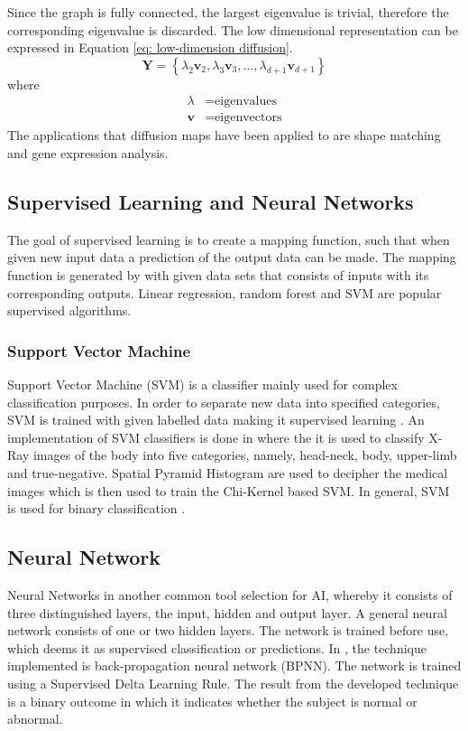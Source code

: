 \documentclass[11pt,twocolumn]{witseiepaper}
\begin{document}
	Since the graph is fully connected, the largest eigenvalue is trivial, therefore the corresponding eigenvalue is discarded. The low dimensional representation can be expressed in Equation \ref{eq: low-dimension diffusion}.
	\begin{equation}
		\textbf{Y} = \left\{\lambda_2\textbf{v}_2, \lambda_3\textbf{v}_3,...,\lambda_{d+1}\textbf{v}_{d+1} \right\}
		\label{eq: low-dimension diffusion}
	\end{equation}
	where
	\begin{align*}
		\lambda &= \text{eigenvalues}\\
		\textbf{v} &= \text{eigenvectors}
	\end{align*}
	The applications that diffusion maps have been applied to are shape matching and gene expression analysis.
	
	
	\subsection{Supervised Learning and Neural Networks}
	The goal of supervised learning is to create a mapping function, such that when given new input data a prediction of the output data can be made. The mapping function is generated by with given data sets that consists of inputs with its corresponding outputs. Linear regression, random forest and SVM are popular supervised algorithms.
	
	\subsubsection{Support Vector Machine}
	Support Vector Machine (SVM) is a classifier mainly used for complex classification purposes. In order to separate new data into specified categories, SVM is trained with given labelled data making it supervised learning \cite{Rebentrost2014}. An implementation of SVM classifiers is done in \cite{saha_classifying_2016} where the it is used to classify X-Ray images of the body into five categories, namely, head-neck, body, upper-limb and true-negative. Spatial Pyramid Histogram are used to decipher the medical images which is then used to train the Chi-Kernel based SVM. In general, SVM is used for binary classification \cite{Rebentrost2014}.
	
	\subsection{Neural Network}
	Neural Networks in another common tool selection for AI, whereby it consists of three distinguished layers, the input, hidden and output layer. A general neural network consists of one or two hidden layers. The network is trained before use, which deems it as supervised classification or predictions. In \cite{jyothi_congenital_2016}, the technique implemented is back-propagation neural network (BPNN). The network is trained using a Supervised Delta Learning Rule. The result from the developed technique is a binary outcome in which it indicates whether the subject is normal or abnormal.
	
\end{document}
